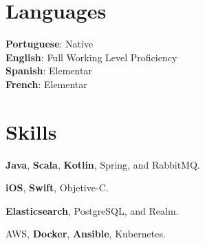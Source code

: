 \documentclass[letterpaper]{deedy-resume} %
\begin{document}
\begin{minipage}[t]{0.33\textwidth}
\sectionspace %


\section{Languages} 
\textbf{Portuguese}: Native\\
\textbf{English}: Full Working Level Proficiency\\
\textbf{Spanish}: Elementar\\
\textbf{French}: Elementar\\
\sectionspace %


\section{Skills}

\textbf{Java}, \textbf{Scala}, \textbf{Kotlin}, Spring, and RabbitMQ.

\vspace{2mm}
\textbf{iOS}, \textbf{Swift}, Objetive-C.

\vspace{2mm}
\textbf{Elasticsearch}, PostgreSQL, and Realm.

\vspace{2mm}
AWS, \textbf{Docker}, \textbf{Ansible}, Kubernetes.


\sectionspace %

\end{minipage} %
\hfill
%
%
\end{document}
